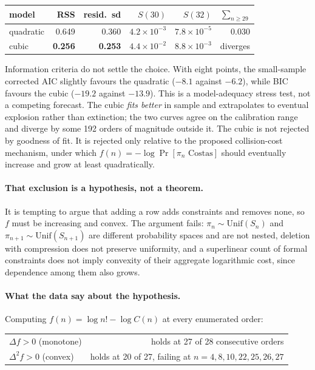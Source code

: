 \documentclass[11pt,a4paper,oneside]{report}
\theoremstyle{definition}
\begin{document}
\begin{center}
\begin{tabular}{@{}lrrrrr@{}}
\toprule
model & RSS & resid.\ sd & $S(30)$ & $S(32)$ & $\sum_{n\ge29}$ \\
\midrule
quadratic & 0.649 & 0.360 & $4.2\times10^{-3}$ & $7.8\times10^{-5}$ & $0.030$ \\
cubic & \textbf{0.256} & \textbf{0.253} & $4.4\times10^{-2}$ & $8.8\times10^{-3}$ & diverges \\
\bottomrule
\end{tabular}
\end{center}

\noindent Information criteria do not settle the choice. With eight points, the small-sample
corrected AIC slightly favours the quadratic ($-8.1$ against $-6.2$), while BIC favours the cubic
($-19.2$ against $-13.9$). This is a model-adequacy stress test, not a competing forecast. The
cubic \emph{fits better} in sample and extrapolates to eventual explosion rather
than extinction; the two curves agree on the calibration range and diverge by
some 192 orders of magnitude outside it. The cubic is not rejected by goodness of
fit. It is rejected only relative to the proposed collision-cost mechanism, under
which $f(n)=-\log\Pr[\pi_n \text{ Costas}]$ should eventually increase and grow at
least quadratically.

\paragraph{That exclusion is a hypothesis, not a theorem.} It is tempting to
argue that adding a row adds constraints and removes none, so $f$ must be
increasing and convex. The argument fails: $\pi_n\sim\mathrm{Unif}(S_n)$ and
$\pi_{n+1}\sim\mathrm{Unif}(S_{n+1})$ are different probability spaces and are not
nested, deletion with compression does not preserve uniformity, and a superlinear
count of formal constraints does not imply convexity of their aggregate
logarithmic cost, since dependence among them also grows.

\paragraph{What the data say about the hypothesis.} Computing
$f(n)=\log n!-\log C(n)$ at every enumerated order:

\begin{center}
\begin{tabular}{@{}lr@{}}
\toprule
$\Delta f>0$ (monotone) & holds at 27 of 28 consecutive orders \\
$\Delta^2 f>0$ (convex) & holds at 20 of 27, failing at $n=4,8,10,22,25,26,27$ \\
\bottomrule
\end{tabular}
\end{center}
\end{document}
